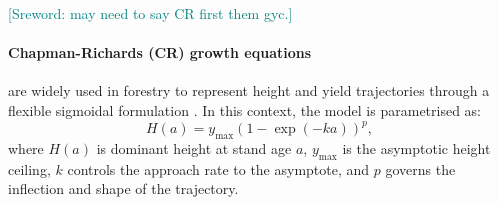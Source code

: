 \documentclass[logo,msc,ai]{infthesis}           %
\newcommand{\sr}[1]{\textcolor{teal}{[Sreword: #1]}}
\newcommand{\fig}[1]{\textcolor{purple}{[FIG: #1]}}
\newcommand{\ai}[1]{\textcolor{brown}{[AI: #1]}}
\begin{document}

\sr{may need to say CR first them gyc.}

\paragraph*{Chapman-Richards (CR) growth equations} are widely used in forestry to represent height and yield trajectories through a flexible sigmoidal formulation \cite{richards1959Flexible_C2_CR,pommerening2015Methods_C2_CR,manso2021Dynamic_C2_CR}. In this context, the model is parametrised as:
\begin{equation}
H(a) = y_{\max}\left(1-\exp(-ka)\right)^p,
\label{eq:background-cr}
\end{equation}
where $H(a)$ is dominant height at stand age $a$, $y_{\max}$ is the asymptotic height ceiling, $k$ controls the approach rate to the asymptote, and $p$ governs the inflection and shape of the trajectory.

\end{document}
